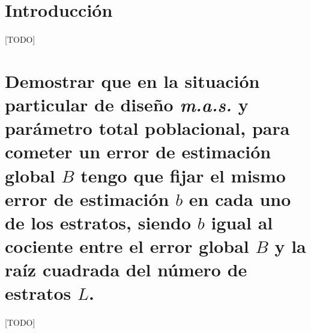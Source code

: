 \documentclass{article}
\begin{document}
  \maketitle


  \section{Introducción}

    \paragraph{}
    [TODO]

  \section{Demostrar que en la situación particular de diseño \emph{m.a.s.} y parámetro total poblacional, para cometer un error de estimación global $B$ tengo que fijar el mismo error de estimación $b$ en cada uno de los estratos, siendo $b$ igual al cociente entre el error global $B$ y la raíz cuadrada del número de estratos $L$.}

    \paragraph{}
    [TODO]



  \nocite{muest2017}
  \nocite{sarndal2003model}

  
  
\end{document}
